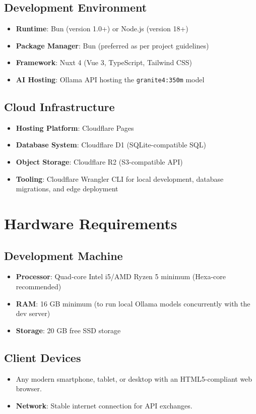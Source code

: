 \documentclass[12pt,a4paper]{report}
\begin{document}
\subsection{Development Environment}
\begin{itemize}
    \item \textbf{Runtime}: Bun (version 1.0+) or Node.js (version 18+)
    \item \textbf{Package Manager}: Bun (preferred as per project guidelines)
    \item \textbf{Framework}: Nuxt 4 (Vue 3, TypeScript, Tailwind CSS)
    \item \textbf{AI Hosting}: Ollama API hosting the \texttt{granite4:350m} model
\end{itemize}

\subsection{Cloud Infrastructure}
\begin{itemize}
    \item \textbf{Hosting Platform}: Cloudflare Pages
    \item \textbf{Database System}: Cloudflare D1 (SQLite-compatible SQL)
    \item \textbf{Object Storage}: Cloudflare R2 (S3-compatible API)
    \item \textbf{Tooling}: Cloudflare Wrangler CLI for local development, database migrations, and edge deployment
\end{itemize}

\section{Hardware Requirements}

\subsection{Development Machine}
\begin{itemize}
    \item \textbf{Processor}: Quad-core Intel i5/AMD Ryzen 5 minimum (Hexa-core recommended)
    \item \textbf{RAM}: 16 GB minimum (to run local Ollama models concurrently with the dev server)
    \item \textbf{Storage}: 20 GB free SSD storage
\end{itemize}

\subsection{Client Devices}
\begin{itemize}
    \item Any modern smartphone, tablet, or desktop with an HTML5-compliant web browser.
    \item \textbf{Network}: Stable internet connection for API exchanges.
\end{itemize}
\end{document}
